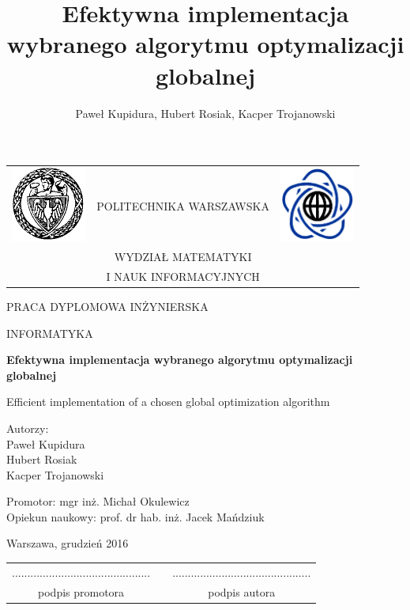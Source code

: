 \documentclass[12pt, twoside, openany, abstract=on]{report}
\author{Paweł Kupidura, Hubert Rosiak, Kacper Trojanowski}
\title{Efektywna implementacja wybranego algorytmu optymalizacji globalnej}
\theoremstyle{definition}
\begin{document}
\begin{titlepage}
\pagestyle{empty}

\noindent
\begin{Large}
\begin{table}[t]
\centering
\begin{tabular}[t]{lcr}
 \includegraphics[width=70pt,height=70pt]{PW} & POLITECHNIKA WARSZAWSKA & \includegraphics[width=70pt,height=70pt]{MiNI}\\
& WYDZIAŁ MATEMATYKI & \\
& I NAUK INFORMACYJNYCH &
\end{tabular}
\end{table}

\begin{center}PRACA DYPLOMOWA INŻYNIERSKA\end{center}
\begin{center}INFORMATYKA\end{center}\end{Large}
\begin{center}
\Huge
\textbf{Efektywna implementacja wybranego algorytmu optymalizacji globalnej}\\
\end{center}

\large Efficient implementation of a chosen global optimization algorithm

\vfill
\begin{center}
\Large
Autorzy:\\
\LARGE
Paweł Kupidura\\
Hubert Rosiak\\
Kacper Trojanowski
\end{center}
\vfill
\begin{center}
\Large
Promotor: mgr inż. Michał Okulewicz\\
Opiekun naukowy: prof. dr hab. inż. Jacek Mańdziuk
\end{center}
\vfill
\begin{center}
\large
Warszawa, grudzień 2016
\end{center}
\newpage
\hfill
\begin{table}[b]
\centering
\begin{tabular}[t]{ccc}
............................................. & \hspace*{100pt} & .............................................\\
podpis promotora & \hspace*{100pt} & podpis autora
\end{tabular}
\end{table}



\end{titlepage}
\end{document}
